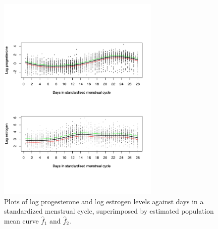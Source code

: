 \documentclass[review]{elsarticle}
\begin{document}
\begin{figure}[h!]
\centering
\includegraphics[width=0.7\textwidth]{bivLiuFig1.pdf}
\caption{Plots of log progesterone  and log estrogen levels against days in a standardized menstrual cycle, superimposed by estimated population mean curve $\hat f_1$ and $\hat f_2$.}
\label{Liu1}
\end{figure}
\end{document}
